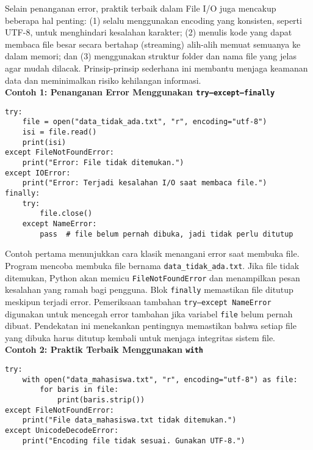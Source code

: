 Selain penanganan error, praktik terbaik dalam File I/O juga mencakup beberapa hal penting:  
(1) selalu menggunakan encoding yang konsisten, seperti UTF-8, untuk menghindari kesalahan karakter;  
(2) menulis kode yang dapat membaca file besar secara bertahap (streaming) alih-alih memuat semuanya ke dalam memori;  
dan (3) menggunakan struktur folder dan nama file yang jelas agar mudah dilacak.  
Prinsip-prinsip sederhana ini membantu menjaga keamanan data dan meminimalkan risiko kehilangan informasi.\\

\noindent\textbf{Contoh 1: Penanganan Error Menggunakan \texttt{try--except--finally}}

\begin{lstlisting}[style=PythonStyle, caption={Penanganan error dasar saat membuka file}]
try:
    file = open("data_tidak_ada.txt", "r", encoding="utf-8")
    isi = file.read()
    print(isi)
except FileNotFoundError:
    print("Error: File tidak ditemukan.")
except IOError:
    print("Error: Terjadi kesalahan I/O saat membaca file.")
finally:
    try:
        file.close()
    except NameError:
        pass  # file belum pernah dibuka, jadi tidak perlu ditutup
\end{lstlisting}

Contoh pertama menunjukkan cara klasik menangani error saat membuka file.  
Program mencoba membuka file bernama \texttt{data\_tidak\_ada.txt}. Jika file tidak ditemukan, Python akan memicu \texttt{FileNotFoundError} dan menampilkan pesan kesalahan yang ramah bagi pengguna.  
Blok \texttt{finally} memastikan file ditutup meskipun terjadi error.  
Pemeriksaan tambahan \texttt{try--except NameError} digunakan untuk mencegah error tambahan jika variabel \texttt{file} belum pernah dibuat.  
Pendekatan ini menekankan pentingnya memastikan bahwa setiap file yang dibuka harus ditutup kembali untuk menjaga integritas sistem file.\\

\noindent\textbf{Contoh 2: Praktik Terbaik Menggunakan \texttt{with}}

\begin{lstlisting}[style=PythonStyle, caption={Menggunakan context manager untuk keamanan file I/O}]
try:
    with open("data_mahasiswa.txt", "r", encoding="utf-8") as file:
        for baris in file:
            print(baris.strip())
except FileNotFoundError:
    print("File data_mahasiswa.txt tidak ditemukan.")
except UnicodeDecodeError:
    print("Encoding file tidak sesuai. Gunakan UTF-8.")
\end{lstlisting}

